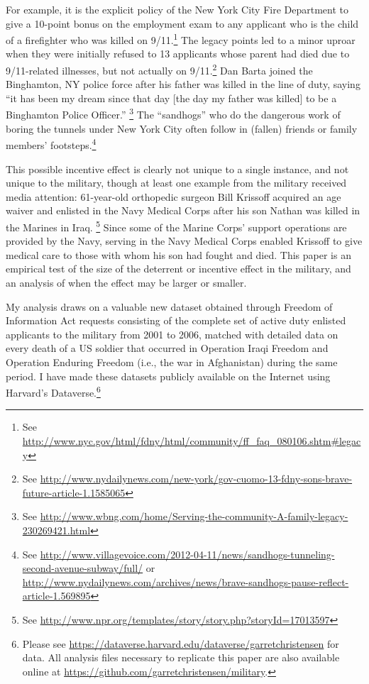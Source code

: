 \documentclass[12pt] {article}
\begin{document}
For example, it is the explicit policy of the New York City Fire Department to give a 10-point bonus on the employment exam to any applicant who is the child of a firefighter who was killed on 9/11.\footnote {See \url{http://www.nyc.gov/html/fdny/html/community/ff_faq_080106.shtm\#legacy}} The legacy points led to a minor uproar when they were initially refused to 13 applicants whose parent had died due to 9/11-related illnesses, but not actually on 9/11.\footnote{See \url{http://www.nydailynews.com/new-york/gov-cuomo-13-fdny-sons-brave-future-article-1.1585065}} Dan Barta joined the Binghamton, NY police force after his father was killed in the line of duty, saying ``it has been my dream since that day [the day my father was killed] to be a Binghamton Police Officer.'' 
\footnote{See \url{http://www.wbng.com/home/Serving-the-community-A-family-legacy-230269421.html}} The ``sandhogs'' who do the dangerous work of boring the tunnels under New York City often follow in (fallen) friends or family members' footsteps.\footnote{See \url{http://www.villagevoice.com/2012-04-11/news/sandhogs-tunneling-second-avenue-subway/full/} or \url{http://www.nydailynews.com/archives/news/brave-sandhogs-pause-reflect-article-1.569895}} 

This possible incentive effect is clearly not unique to a single instance, and not unique to the military, though at least one example from the military received media attention: 61-year-old orthopedic surgeon Bill Krissoff acquired an age waiver and enlisted in the Navy Medical Corps after his son Nathan was killed in the Marines in Iraq.
\footnote{See \url{http://www.npr.org/templates/story/story.php?storyId=17013597}}
Since some of the Marine Corps' support operations are provided by the Navy, serving in the Navy Medical Corps enabled Krissoff to give medical care to those with whom his son had fought and died.  This paper is an empirical test of the size of the deterrent or incentive effect in the military, and an analysis of when the effect may be larger or smaller. 


My analysis draws on a valuable new dataset obtained through Freedom of Information Act requests consisting of the complete set of active duty enlisted applicants to the military from 2001 to 2006, matched with detailed data on every death of a US soldier that occurred in Operation Iraqi Freedom and Operation
Enduring Freedom (i.e., the war in Afghanistan) during the same period. I have made these datasets publicly available on the Internet using Harvard's Dataverse.\footnote{Please see \url{https://dataverse.harvard.edu/dataverse/garretchristensen} for data. All analysis files necessary to replicate this paper are also available online at \url{https://github.com/garretchristensen/military}.}
\end{document}
